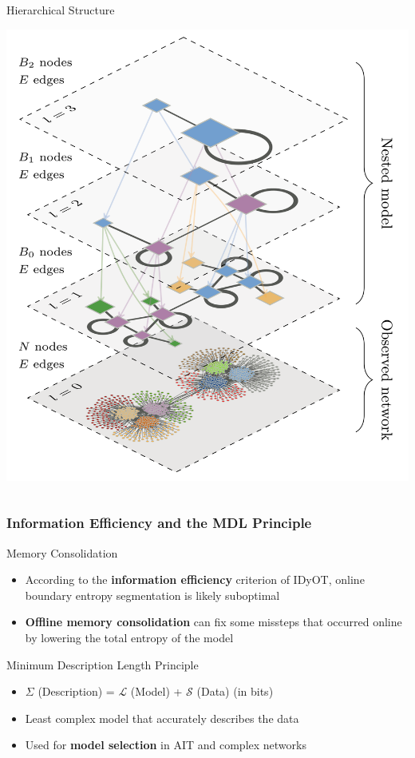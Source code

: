\begin{frame}
\begin{columns}
\begin{column}{0.5\textwidth}
\begin{block}{Hierarchical Structure}
\begin{center}
          \includegraphics[width=\textwidth]{images/hierarchical-block-model.png}
        \end{center}
      \end{block}
    \end{column}
  \end{columns}
\end{frame}

\begin{frame}
  \frametitle{Information Efficiency and the MDL Principle}
  \begin{block}{Memory Consolidation}
    \begin{itemize}
      \item According to the \textbf{information efficiency} criterion of IDyOT, online boundary entropy segmentation is likely suboptimal
      \item \textbf{Offline memory consolidation} can fix some missteps that occurred online by lowering the total entropy of the model
    \end{itemize}
  \end{block}
  \begin{block}{Minimum Description Length Principle}
    \begin{itemize}
      \item $\Sigma$ (Description) = $\mathcal{L}$ (Model) + $\mathcal{S}$ (Data) (in bits)
      \item Least complex model that accurately describes the data
      \item Used for \textbf{model selection} in AIT and complex networks
    \end{itemize}
  \end{block}
\end{frame}


